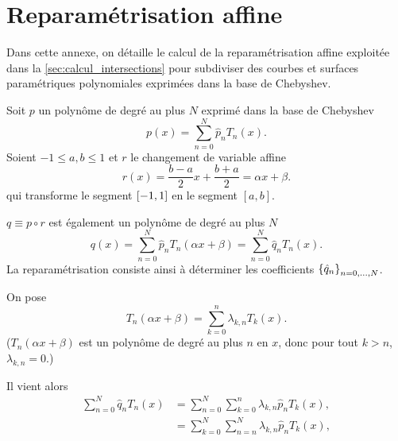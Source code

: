 \chapter{Reparamétrisation affine}%
\label{app:cdv_cheb}
%
%
\def\axpb{\alpha x + \beta}

Dans cette annexe, on détaille le calcul de la reparamétrisation affine exploitée dans la \autoref{sec:calcul_intersections} pour subdiviser des courbes et surfaces paramétriques polynomiales exprimées dans la base de Chebyshev.
\par\bigskip
Soit $p$ un polynôme de degré au plus $N$ exprimé dans la base de Chebyshev
\begin{equation*}
	p(x) = \sum_{n=0}^N \hat{p}_n T_n(x).
\end{equation*}
%
Soient $-1 \leq a, b \leq 1$ et $r$ le changement de variable affine
\begin{equation*}
	r(x) = \frac{b - a}{2}x + \frac{b + a}{2} = \axpb .
\end{equation*}
qui transforme le segment $\left[ -1, 1 \right]$ en le segment $\left[a,b\right]$.
\par
$q \equiv p \circ r$ est également un polynôme de degré au plus $N$
\begin{equation*}
	q(x) = \sum_{n=0}^N \hat{p}_n T_n(\axpb) 
	= \sum_{n=0}^N \hat{q}_n T_n(x).
\end{equation*}
La reparamétrisation consiste ainsi à déterminer les coefficients $\left\{{\hat{q}}_{n}\right\}_{{n}={0},\ldots,{N}}$.\par
%
On pose
\begin{equation}
	T_n(\axpb) = \sum_{k=0}^{n} \lambda_{k,n} T_k(x).
	\label{eq:combinaison_cdv}
\end{equation}
($T_n(\axpb)$ est un polynôme de degré au plus $n$ en $x$, donc pour tout $k > n$, $\lambda_{k,n} = 0$.)
\par
Il vient alors
\begin{align*}
	\sum_{n=0}^N \hat{q}_n T_n(x)
	&= \sum_{n=0}^N \sum_{k=0}^{n} \lambda_{k,n} \hat{p}_n T_k(x), \\
	&= \sum_{k=0}^N \sum_{n=n}^{N} \lambda_{k,n} \hat{p}_n T_k(x),
\end{align*}
